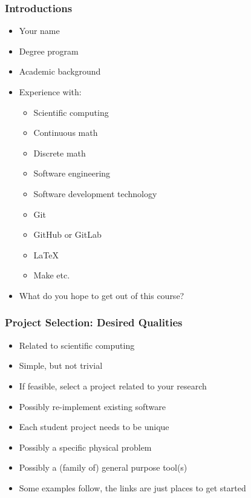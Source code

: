 \documentclass[t,12pt,numbers,fleqn]{beamer}
\begin{document}

\begin{frame}
\frametitle{Introductions}

\begin{itemize}
\item Your name
\item Degree program
\item Academic background
\item Experience with:
\begin{itemize}
\item Scientific computing
\item Continuous math
\item Discrete math
\item Software engineering
\item Software development technology
\bi
\item Git
\item GitHub or GitLab
\item LaTeX
\item Make etc.
\ei
\end{itemize}
\item What do you hope to get out of this course?
\end{itemize}

\end{frame}


\begin{frame}
\frametitle{Project Selection: Desired Qualities}
\begin{itemize}
\item Related to scientific computing
\item Simple, but not trivial
\item If feasible, select a project related to your research
\item Possibly re-implement existing software
\item Each student project needs to be unique
\item Possibly a specific physical problem
\item Possibly a (family of) general purpose tool(s)
\item Some examples follow, the links are just places to get started
\end{itemize}
\end{frame}

\end{document}
